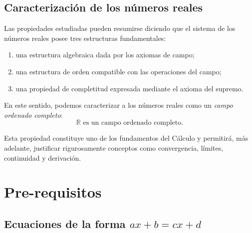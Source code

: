 \documentclass[12pt]{article}
\theoremstyle{plain}
\theoremstyle{definition}
\theoremstyle{remark}
\begin{document}
\subsection*{Caracterización de los números reales}

Las propiedades estudiadas pueden resumirse diciendo que el sistema de
los números reales posee tres estructuras fundamentales:

\begin{enumerate}
    \item una estructura algebraica dada por los axiomas de campo;

    \item una estructura de orden compatible con las operaciones del campo;

    \item una propiedad de completitud expresada mediante el axioma del
    supremo.
\end{enumerate}

En este sentido, podemos caracterizar a los números reales como un
\emph{campo ordenado completo}:
\[
\boxed{
\mathbb{R}\text{ es un campo ordenado completo}.
}
\]

Esta propiedad constituye uno de los fundamentos del Cálculo y permitirá,
más adelante, justificar rigurosamente conceptos como convergencia,
límites, continuidad y derivación.

\section{Pre-requisitos}\label{pre-requisitos}

\subsection{\texorpdfstring{Ecuaciones de la forma
\(ax+b=cx+d\)}{Ecuaciones de la forma ax+b=cx+d}}\label{ecuaciones-de-la-forma-axbcxd}
\end{document}
